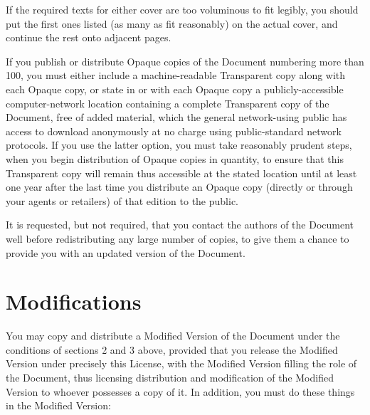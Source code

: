 	If the required texts for either cover are too voluminous to fit
	legibly, you should put the first ones listed (as many as fit
	reasonably) on the actual cover, and continue the rest onto adjacent
	pages.

	If you publish or distribute Opaque copies of the Document numbering
	more than 100, you must either include a machine-readable Transparent
	copy along with each Opaque copy, or state in or with each Opaque copy
	a publicly-accessible computer-network location containing a complete
	Transparent copy of the Document, free of added material, which the
	general network-using public has access to download anonymously at no
	charge using public-standard network protocols.  If you use the latter
	option, you must take reasonably prudent steps, when you begin
	distribution of Opaque copies in quantity, to ensure that this
	Transparent copy will remain thus accessible at the stated location
	until at least one year after the last time you distribute an Opaque
	copy (directly or through your agents or retailers) of that edition to
	the public.

	It is requested, but not required, that you contact the authors of the
	Document well before redistributing any large number of copies, to give
	them a chance to provide you with an updated version of the Document.


	\section{Modifications}

	You may copy and distribute a Modified Version of the Document under
	the conditions of sections 2 and 3 above, provided that you release
	the Modified Version under precisely this License, with the Modified
	Version filling the role of the Document, thus licensing distribution
	and modification of the Modified Version to whoever possesses a copy
	of it.  In addition, you must do these things in the Modified Version:

